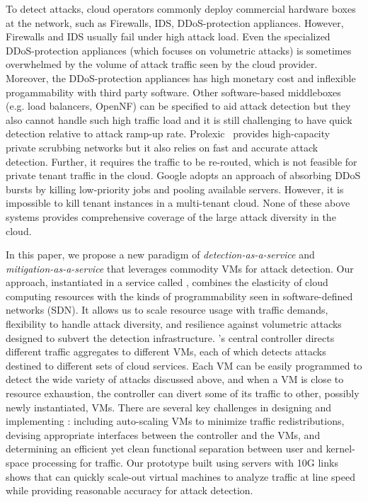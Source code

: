 To detect attacks, cloud operators commonly deploy
commercial hardware boxes at the network, such as Firewalls, IDS, DDoS-protection appliances. 
However, Firewalls and IDS usually fail under high attack load. Even the specialized DDoS-protection appliances
(which focuses on volumetric attacks) is sometimes overwhelmed by the volume of attack
traffic seen by the cloud provider. Moreover, the DDoS-protection appliances has high monetary cost and inflexible progammability with third party software. Other software-based middleboxes (e.g. load balancers, OpenNF) can be specified to aid attack detection but they also cannot handle such high traffic load and it is still challenging to have quick detection relative to attack ramp-up rate. 
%
Prolexic~\cite{Prolexic} provides high-capacity private scrubbing networks but it also relies on fast and accurate attack detection. Further, it requires the traffic to be re-routed, which is not feasible for private tenant traffic in the cloud.
%
Google adopts an approach of absorbing DDoS bursts by killing low-priority jobs and pooling available servers. However, it is impossible to kill tenant instances in a multi-tenant cloud. 
%
None of these above systems provides comprehensive
coverage of the large attack diversity in the cloud. 

In this paper, we propose a new paradigm of  
{\em detection-as-a-service} and {\em mitigation-as-a-service}
that leverages commodity VMs for attack detection. 
Our approach, instantiated in a service called \nimbus, combines the
elasticity of cloud computing resources 
with the kinds of programmability seen in software-defined networks
(SDN).
%
It allows us to scale resource usage with traffic demands, flexibility
to handle attack diversity, and resilience against volumetric attacks
designed to subvert the detection infrastructure.
%
\nimbus's central controller directs different traffic aggregates to
different VMs, each of which detects attacks destined to different
sets of cloud services.
%
Each VM can be easily programmed to detect the wide variety of attacks
discussed above, and when a VM is close to resource exhaustion, the
controller can divert some of its traffic to other, possibly newly
instantiated, VMs.
%
There are several key challenges in designing and implementing
\nimbus: including auto-scaling VMs to minimize traffic
redistributions, devising appropriate interfaces between the
controller and the VMs, and determining an efficient yet clean
functional separation between user and kernel-space processing for
traffic.
%
Our prototype built using servers with 10G links shows that \nimbus
can quickly scale-out virtual machines to analyze traffic at line
speed while providing reasonable accuracy for attack detection.




